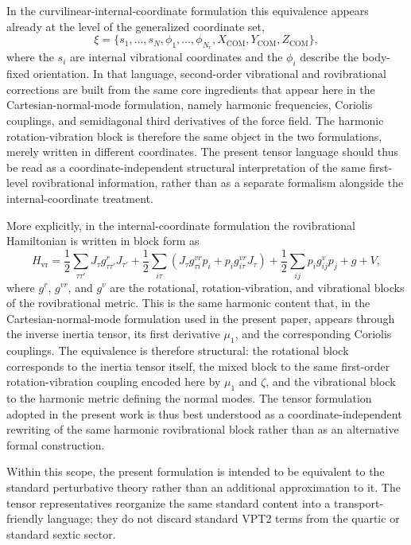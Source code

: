 \documentclass[journal=jacsat,manuscript=article]{achemso}
\begin{document}
In the curvilinear-internal-coordinate formulation this equivalence
appears already at the level of the generalized coordinate set,
\begin{equation}
\xi = \{s_1,\ldots,s_N,\phi_1,\ldots,\phi_{N_r},
X_{\mathrm{COM}},Y_{\mathrm{COM}},Z_{\mathrm{COM}}\},
\end{equation}
where the $s_i$ are internal vibrational coordinates and the $\phi_i$
describe the body-fixed orientation.\cite{cubic-internal_2024} In
that language, second-order vibrational and rovibrational corrections
are built from the same core ingredients that appear here in the
Cartesian-normal-mode formulation, namely harmonic frequencies,
Coriolis couplings, and semidiagonal third derivatives of the force
field. The harmonic rotation-vibration block is therefore the same
object in the two formulations, merely written in different
coordinates. The present tensor language should thus be read as a
coordinate-independent structural interpretation of the same
first-level rovibrational information, rather than as a separate
formalism alongside the internal-coordinate treatment.

More explicitly, in the internal-coordinate formulation the
rovibrational Hamiltonian is written in block form as
\begin{equation}
H_{\mathrm{vr}}
=
\frac12 \sum_{\tau\tau'} J_\tau g^{r}_{\tau\tau'} J_{\tau'}
+ \frac12 \sum_{i\tau}\left(J_\tau g^{vr}_{\tau i} p_i + p_i g^{vr}_{i\tau} J_\tau\right)
+ \frac12 \sum_{ij} p_i g^{v}_{ij} p_j
+ g + V,
\end{equation}
where $g^r$, $g^{vr}$, and $g^v$ are the rotational,
rotation-vibration, and vibrational blocks of the rovibrational
metric.\cite{cubic-internal_2024} This is the same harmonic
content that, in the Cartesian-normal-mode formulation used in the
present paper, appears through the inverse inertia tensor, its first
derivative $\mu_1$, and the corresponding Coriolis couplings.
The equivalence is therefore structural: the rotational block
corresponds to the inertia tensor itself, the mixed block to the same
first-order rotation-vibration coupling encoded here by $\mu_1$ and
$\zeta$, and the vibrational block to the harmonic metric defining the
normal modes. The tensor formulation adopted in the present work is
thus best understood as a coordinate-independent rewriting of the same
harmonic rovibrational block rather than as an alternative formal
construction.

Within this scope, the present formulation is intended to be
equivalent to the standard perturbative theory rather than an
additional approximation to it. The tensor representatives reorganize
the same standard content into a transport-friendly language; they do
not discard standard VPT2 terms from the quartic or standard sextic
sector.
\end{document}
